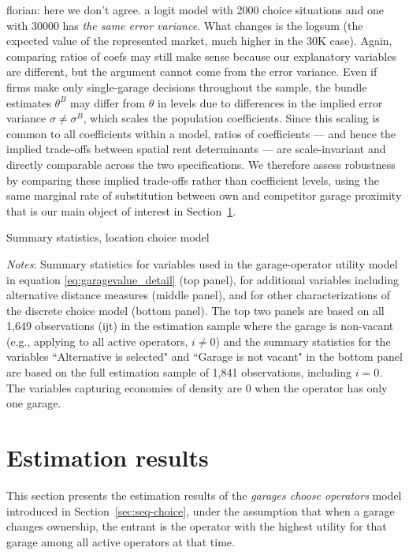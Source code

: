 \documentclass[12pt]{article}
\newcommand{\florian}[1]{\textcolor[rgb]{0,0.5,0.99}{florian: #1}}
\newcommand{\rootdir}{..}  %
\newcommand{\tables}{\rootdir/\rootdir/Output/tables}
\newcommand\fnote[1]{\captionsetup{font=small}\caption*{\emph{Notes}: #1}} %
\begin{document}
\florian{here we don't agree. a logit model with 2000 choice situations and one with 30000 has \emph{the same error variance}. What changes is the logsum (the expected value of the represented market, much higher in the 30K case). Again, comparing ratios of coefs may still make sense because our explanatory variables are different, but the argument cannot come from the error variance.}
Even if firms make only single-garage decisions throughout the sample, the bundle 
estimates $\theta^B$ may differ from $\theta$ in levels due to differences 
in the implied error variance $\sigma \neq \sigma^B$, which scales the population coefficients. %
Since this 
scaling is common to all coefficients within a model, ratios of coefficients 
--- and hence the implied trade-offs between spatial rent determinants --- 
are scale-invariant and directly comparable across the two specifications. 
We therefore assess robustness by comparing these implied trade-offs rather 
than coefficient levels, using the same marginal rate of substitution 
between own and competitor garage proximity that is our main object of 
interest in Section~\ref{S:Results}.


\begin{table}[!tb]
\caption{Summary statistics, location choice model}
\label{T:logitvars}
\begin{adjustbox}{max width = \textwidth, center}
	
\end{adjustbox}
\newline
\fnote{Summary statistics for variables used in the garage-operator utility model in equation \eqref{eq:garagevalue_detail} (top panel), for additional variables including alternative distance measures (middle panel), and for other characterizations of the discrete choice model (bottom panel). The top two panels are based on all 1,649 observations (ijt) in the estimation sample where the garage is non-vacant (e.g., applying to all active operators, $ i\neq 0$) and the summary statistics for the variables ``Alternative is selected" and ``Garage is not vacant" in the bottom panel are based on the full estimation sample of 1,841 observations, including $i=0$. The variables capturing economies of density are 0 when the operator has only one garage.}
\end{table}


\section{Estimation results}\label{S:Results}
This section presents the estimation results of the \emph{garages choose operators} 
model introduced in Section~\ref{sec:seq-choice}, under the assumption that 
when a garage changes ownership, the entrant is the operator with the highest 
utility for that garage among all active operators at that time.
\end{document}
